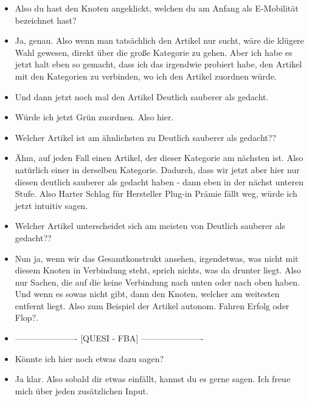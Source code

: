 {\begin{itemize}[]
              Also ich wollte es jetzt so spezifisch wie möglich machen.
              Ich könnte natürlich auch hier lang, also den Knoten anklicken und dann schauen, wo der Artikel ist.
        \item {} Also du hast den Knoten angeklickt, welchen du am Anfang als E-Mobilität bezeichnet hast?
        \item {} Ja, genau.
              Also wenn man tatsächlich den Artikel nur sucht, wäre die klügere Wahl gewesen, direkt über die große Kategorie zu gehen.
              Aber ich habe es jetzt halt eben so gemacht, dass ich das irgendwie probiert habe, den Artikel mit den Kategorien zu verbinden, wo ich den Artikel zuordnen würde.
        \item {} Und dann jetzt noch mal den Artikel \flqq Deutlich sauberer als gedacht\frqq{}.
        \item {} Würde ich jetzt Grün zuordnen. Also hier.
        \item {} Welcher Artikel ist am ähnlichsten zu \flqq Deutlich sauberer als gedacht?\frqq{}?
        \item {} Ähm, auf jeden Fall einen Artikel, der dieser Kategorie am nächsten ist.
              Also natürlich einer in derselben Kategorie.
              Dadurch, dass wir jetzt aber hier nur diesen deutlich sauberer als gedacht haben - dann eben in der nächst unteren Stufe.
              Also \flqq Harter Schlag für Hersteller Plug-in Prämie fällt weg\frqq{}, würde ich jetzt intuitiv sagen.
        \item {} Welcher Artikel unterscheidet sich am meisten von \flqq Deutlich sauberer als gedacht?\frqq{}?
        \item {} Nun ja, wenn wir das Gesamtkonstrukt ansehen, irgendetwas, was nicht mit diesem Knoten in Verbindung steht, sprich nichts, was da drunter liegt.
              Also nur Sachen, die auf die keine Verbindung nach unten oder nach oben haben.
              Und wenn es sowas nicht gibt, dann den Knoten, welcher am weitesten entfernt liegt.
              Also zum Beispiel der Artikel \flqq autonom. Fahren Erfolg oder Flop?\frqq{}.
        \item {----------------------} [QUESI - FBA] {----------------------}
        \item {} Könnte ich hier noch etwas dazu sagen?
        \item {} Ja klar. Also sobald dir etwas einfällt, kannst du es gerne sagen. Ich freue mich über jeden zusätzlichen Input.

\end{itemize}}
